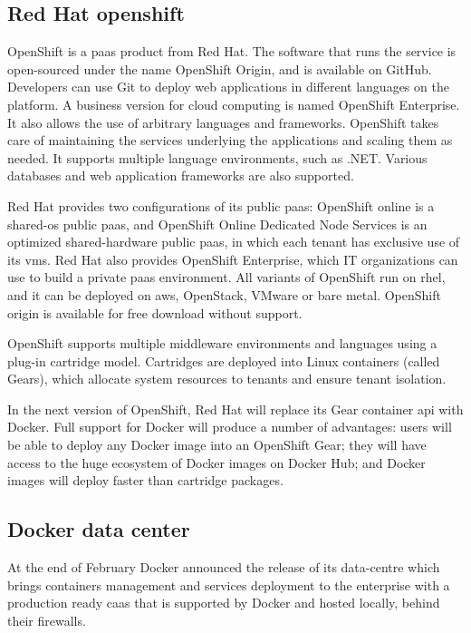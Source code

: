 \subsection*{Red Hat openshift}
\label{sec:problemSpace-cloudPlatform-openshift}
OpenShift is a \ac{paas} product from Red Hat. The software that runs the service is open-sourced
under the name OpenShift Origin, and is available on GitHub. Developers can use Git to deploy web 
applications in different languages on the platform. A business version for cloud computing is named
OpenShift Enterprise. It also allows the use of arbitrary languages and frameworks. OpenShift takes
care of maintaining the services underlying the applications and scaling them as needed. It supports
multiple language environments, such as .NET. Various databases and web application frameworks are also
supported.

Red Hat provides two configurations of its public \ac{paas}: OpenShift online is a shared-\acs{os}
public \ac{paas}, and OpenShift Online Dedicated Node Services is an optimized shared-hardware public
\ac{paas}, in which each tenant has exclusive use of its \ac{vm}s. Red Hat also provides OpenShift 
Enterprise, which IT organizations can use to build a private \ac{paas} environment. All variants of
OpenShift run on \ac{rhel}, and it can be deployed on \ac{aws}, OpenStack, VMware or bare metal.
OpenShift origin is available for free download without support.

OpenShift supports multiple middleware environments and languages using a plug-in cartridge model.
Cartridges are deployed into Linux containers (called Gears), which allocate system resources to
tenants and ensure tenant isolation.

In the next version of OpenShift, Red Hat will replace its Gear container \acs{api} with Docker.
Full support for Docker will produce a number of advantages: users will be able to deploy any Docker
image into an OpenShift Gear; they will have access to the huge ecosystem of Docker images on Docker
Hub; and Docker images will deploy faster than cartridge packages.

\subsection*{Docker data center}
\label{sec:problemSpace-cloudPlatform-datacentre}
At the end of February Docker announced \cite{dockerDatacentre} the release of its data-centre which
brings containers management and services deployment to the enterprise with a production ready
\ac{caas} that is supported by Docker and hosted locally, behind their firewalls.

